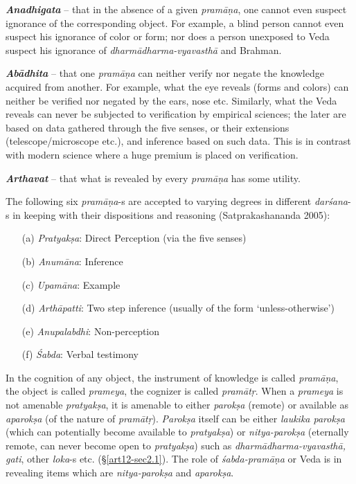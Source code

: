 {{\sl\bfseries Anadhigata}\relax}  -- that in the absence of a given {\sl pramāṇa}, one cannot even suspect ignorance of the corresponding object. For example, a blind person cannot even suspect his ignorance of color or form; nor does a person unexposed to Veda suspect his ignorance of {\sl dharmādharma-vyavasthā} and Brahman.

{{\sl\bfseries Abādhita}\relax} -- that one {\sl pramāṇa} can neither verify nor negate the knowledge acquired from another. For example, what the eye reveals (forms and colors) can neither be veriﬁed nor negated by the ears, nose etc. Similarly, what the Veda reveals can never be subjected to veriﬁcation by empirical sciences; the later are based on data gathered through the ﬁve senses, or their extensions (telescope/microscope etc.), and inference based on such data. This is in contrast with modern science where a huge premium is placed on veriﬁcation.

{{\sl\bfseries Arthavat}\relax} -- that what is revealed by every {\sl pramāṇa} has some utility. 

The following six {\sl pramāṇa}-s are accepted to varying degrees in different {\sl darśana}-s in keeping with their dispositions and reasoning (Satprakashananda 2005):
\begin{itemize}
\itemsep=0pt
\item[(a)] {\sl Pratyakṣa}: Direct Perception (via the five senses)
\item[(b)] {\sl Anumāna}: Inference
\item[(c)] {\sl Upamāna}: Example
\item[(d)] {\sl Arthāpatti}: Two step inference (usually of the form `unless-otherwise')
\item[(e)] {\sl Anupalabdhi}: Non-perception
\item[(f)] {\sl Śabda}: Verbal testimony
\end{itemize}

In the cognition of any object, the instrument of knowledge is called {\sl pramāṇa}, the object is called {\sl prameya}, the cognizer is called {\sl pramātṛ}. When a {\sl prameya} is not amenable {\sl pratyakṣa}, it is amenable to either {\sl parokṣa} (remote) or available as {\sl aparokṣa} (of the nature of {\sl pramātṛ}). {\sl Parokṣa} itself can be either {\sl laukika parokṣa} (which can potentially become available to {\sl pratyakṣa}) or {\sl nitya-parokṣa} (eternally remote, can never become open to {\sl pratyakṣa}) such as {\sl dharmādharma-vyavasthā, gati}, other {\sl loka}-s etc. (\S\ref{art12-sec2.1}). The role of {\sl śabda-pramāṇa} or Veda is in revealing items which are {\sl nitya-parokṣa} and {\sl aparokṣa}.

